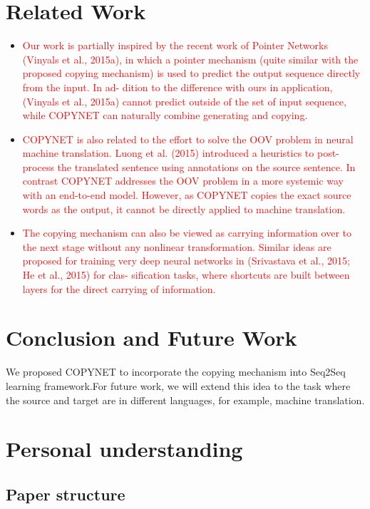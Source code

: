 \documentclass[UTF8]{ctexart}
\begin{document}
    \section{Related Work}
    \begin{itemize}
    \item \textcolor{red}{Our work is partially inspired by the recent work
    of Pointer Networks (Vinyals et al., 2015a), in
    which a pointer mechanism (quite similar with the
    proposed copying mechanism) is used to predict
    the output sequence directly from the input. In ad-
    dition to the difference with ours in application,
    (Vinyals et al., 2015a) cannot predict outside of
    the set of input sequence, while COPYNET can
    naturally combine generating and copying.}
    \item \textcolor{red}{COPYNET is also related to the effort to solve
    the OOV problem in neural machine translation.
    Luong et al. (2015) introduced a heuristics to post-
    process the translated sentence using annotations
    on the source sentence. In contrast COPYNET addresses the OOV problem in a more systemic way
    with an end-to-end model. However, as COPYNET copies the exact source words as the output, it
    cannot be directly applied to machine translation.}
    \item \textcolor{red}{The copying mechanism can also be viewed as
    carrying information over to the next stage without
    any nonlinear transformation. Similar ideas are
    proposed for training very deep neural networks in
    (Srivastava et al., 2015; He et al., 2015) for clas-
    sification tasks, where shortcuts are built between
    layers for the direct carrying of information.}

    \end{itemize}

    \section{Conclusion and Future Work}
    We proposed COPYNET to incorporate the copying mechanism into Seq2Seq learning framework.For future work, we will extend this idea to the task where the source and target are in different
    languages, for example, machine translation.

    \section{Personal understanding}
    \subsection{Paper structure}
\end{document}
